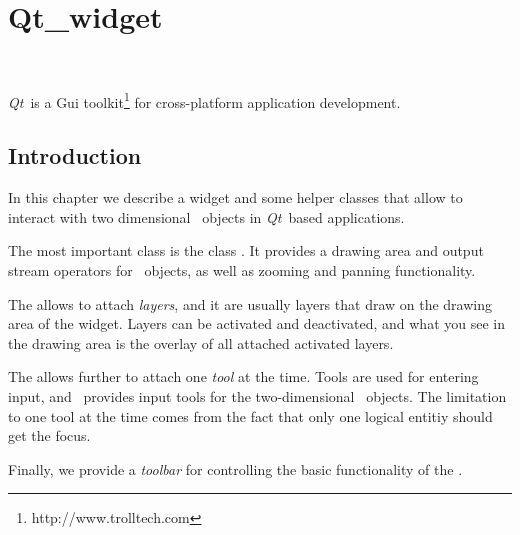 
\newcommand{\qt}{{\em Qt}}      %

\gdef\lciIfHtmlClassLinks{\lcFalse}
\gdef\lciIfHtmlRefLinks{\lcFalse}
\gdef\lciIfHtmlLinks{\lcFalse}

\chapter{Qt\_widget}
\label{chapterQtwidget}

\\

\qt\ is a {\sc Gui} toolkit\footnote{http://www.trolltech.com} for
cross-platform application development. 

\section{Introduction}

In this chapter we describe a widget and some helper classes that
allow to interact with two dimensional \cgal\ objects in \qt\ based applications.

The most important class is the class . It provides
a drawing area and output stream operators for \cgal\ objects, as well
as zooming and panning functionality.

The  allows to attach {\em layers}, and
it are usually layers that draw on the drawing area of the widget.
Layers can be activated and deactivated, and what you see in the drawing area
is the overlay of all attached activated layers.

The  allows further to attach one {\em tool} at the time. 
Tools are used for entering input, and \cgal\ provides input tools for the
two-dimensional \cgal\ objects. The limitation to one tool at the time comes
from the fact that only one logical entitiy should get the focus.

Finally, we provide a {\em toolbar} for controlling the basic functionality
of the .


